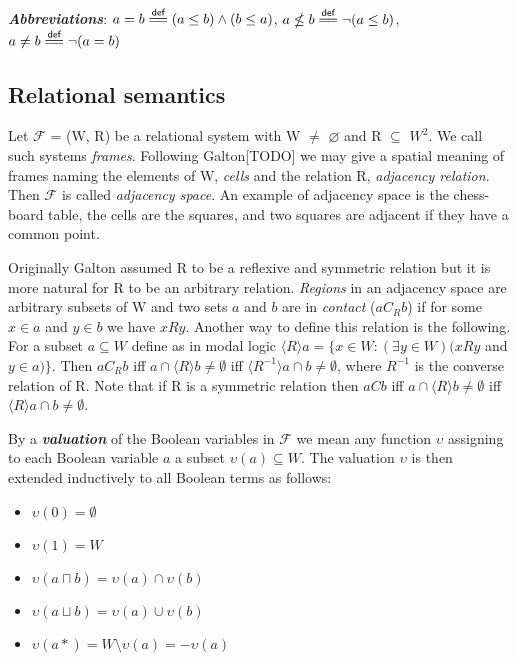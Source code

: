 \documentclass{article}
\newcommand\eqdef{\mathrel{\overset{\makebox[0pt]{\mbox{\normalfont\scriptsize\sffamily def}}}{=\joinrel=}}}
\newcommand\F{\mathcal{F}}
\begin{document}
	\noindent\textbf{\textit{Abbreviations}}:
		$a = b \eqdef (a \leq b) \land (b \leq a)$,
		$a \nleq b \eqdef \neg(a \leq b)$,
		$a \neq b \eqdef \neg(a = b)$

	\subsection{Relational semantics}

	\par
	Let $\F$ = (W, R) be a relational system with W $\neq$ $\varnothing$ and R $\subseteq$ $W^2$. We call such systems \textit{frames}. Following Galton[TODO] we may give a spatial meaning of frames naming the elements of W, \textit{cells} and the relation R, \textit{adjacency relation}. Then $\F$ is called \textit{adjacency space}. An example of adjacency space is the chess-board table, the cells are the squares, and two squares are adjacent if they have a common point.

	\par
	Originally Galton assumed R to be a reflexive and symmetric relation but it is more natural for R to be an arbitrary relation. \textit{Regions} in an adjacency space are arbitrary subsets of W and two sets $a$ and $b$ are in \textit{contact} ($aC_Rb$) if for some $x \in a$ and $y \in b$ we have $xRy$. Another way to define this relation is the following. For a subset $a \subseteq W$ define as in modal logic $\langle R \rangle a = \{ x \in W : (\exists y \in W)(xRy$ and $y \in a)\}$. Then $aC_Rb$ iff $a \cap \langle R \rangle b \neq \emptyset$ iff $\langle R^{-1} \rangle a \cap b \neq \emptyset$, where $R^{-1}$ is the converse relation of R. Note that if R is a symmetric relation then $aCb$ iff $a \cap \langle R \rangle b \neq \emptyset$ iff $\langle R \rangle a \cap b \neq \emptyset$.

	\par
	By a \textbf{\textit{valuation}} of the Boolean variables in $\F$ we mean any function $\upsilon$ assigning to each Boolean variable $a$ a subset $\upsilon(a) \subseteq W$. The valuation $\upsilon$ is then extended inductively to all Boolean terms as follows:

	\begin{itemize}
		\item $\upsilon(0) = \emptyset$
		\item $\upsilon(1) = W$
		\item $\upsilon(a \sqcap b) = \upsilon(a) \cap \upsilon(b)$
		\item $\upsilon(a \sqcup b) = \upsilon(a) \cup \upsilon(b)$
		\item $\upsilon(a*) = W \setminus \upsilon(a) = -\upsilon(a)$
	\end{itemize}
\end{document}
